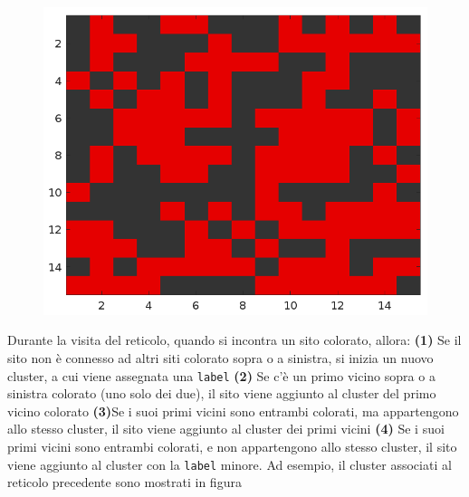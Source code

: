 \begin{figure}[H]
\begin{minipage}{0.45\textwidth}
\begin{tabular}{|*{15}{c|}}
		\end{tabular}
	\end{minipage}
	\hfill
	\begin{minipage}{0.45\textwidth}
		\centering
		\includegraphics[width=\linewidth]{images/basegrid}
		\label{fig:basegrid}
	\end{minipage}
\end{figure}
\noindent
Durante la visita del reticolo, quando si incontra un sito colorato, allora: \textbf{(1)} Se il sito non è connesso ad altri siti colorato sopra o a sinistra, si inizia un nuovo cluster, a cui viene assegnata una \texttt{label} \textbf{(2)} Se c’è un primo vicino sopra o a sinistra colorato (uno solo dei due), il sito viene aggiunto al cluster del primo vicino colorato \textbf{(3)}Se i suoi primi vicini sono entrambi colorati, ma appartengono allo stesso cluster, il sito viene aggiunto al cluster dei primi vicini \textbf{(4)} Se i suoi primi vicini sono entrambi colorati, e non appartengono allo stesso cluster, il sito viene aggiunto al cluster con la \texttt{label} minore. Ad esempio, il cluster associati al reticolo precedente sono
mostrati in figura
